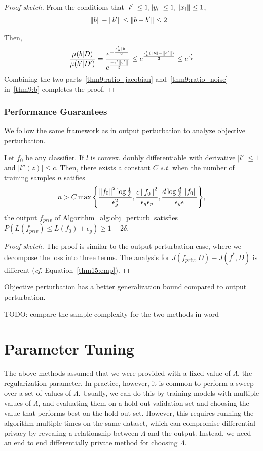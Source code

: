 \documentclass{article} %
\begin{document}
\begin{proof}[Proof sketch]
From the conditions that $\left\lvert l'\right\rvert \le 1, \left\lvert y_i\right\rvert \le 1, \left\lVert x_i\right\rVert \le 1$,
\begin{align*}
& \left\lVert b\right\rVert - \left\lVert b'\right\rVert \le \left\lVert b - b'\right\rVert \le 2
\end{align*}

Then, \begin{align}
 \frac{\mu(b | D)}{\mu(b' | D')} = \frac{e^{-\frac{\epsilon_p' \left\lVert b\right\rVert}{2}}}{e^{\frac{-\epsilon' \left\lVert b'\right\rVert}{2}}}\le e^{\frac{\epsilon_p'(\left\lVert b\right\rVert - \left\lVert b'\right\rVert)}{2}} \le e^{\epsilon'_p} \label{thm9:ratio_noise}
\end{align}
 Combining the two parts~\eqref{thm9:ratio_jacobian} and~\eqref{thm9:ratio_noise} in~\eqref{thm9:b} completes the proof.
\end{proof}

\subsubsection{Performance Guarantees}
We follow the same framework as in output perturbation to analyze objective perturbation.
\begin{theorem}
Let $f_0$ be any classifier. If $l$ is convex, doubly differentiable with derivative $|l'| \le 1$ and $|l''(z)| \le c$. Then, there exists a constant $C$ \emph{s.t.} when the number of training samples $n$ satifies
$$n > C\max{\left\{ \frac{\left\lVert f_0\right\rVert^2 \log{\frac{1}{\delta}}}{\epsilon_g^2}, \frac{c\left\lVert f_0\right\rVert^2}{\epsilon_g \epsilon_p}, \frac{d\log{\frac{d}{\delta}} \left\lVert f_0\right\rVert}{\epsilon_g\epsilon}\right\}},$$
the output $f_{priv}$ of Algorithm~\ref{alg:obj_perturb} satisfies $P(L(f_{priv}) \le L(f_0) + \epsilon_g) \ge 1 - 2\delta$.
\end{theorem}
\begin{proof}[Proof sketch]
The proof is similar to the output perturbation case, where we decompose the loss into three terms. The analysis for $J(f_{priv}, D) - J(f^*, D)$ is different (\emph{cf.} Equation~\eqref{thm15:emp}).
\end{proof}

Objective perturbation has a better generalization bound compared to output perturbation.

TODO: compare the sample complexity for the two methods in word
\section{Parameter Tuning}
The above methods assumed that we were provided with a fixed value of $\Lambda$,
the regularization parameter. In practice, however, it is common to perform a
sweep over a set of values of $\Lambda$. Usually, we can do this by training
models with multiple values of $\Lambda$, and evaluating them on a hold-out
validation set and choosing the value that performs best on the hold-out set.
However, this requires running the algorithm multiple times on the same dataset,
which can compromise differential privacy by revealing a relationship between
$\Lambda$ and the output. Instead, we need an end to end differentially private
method for choosing $\Lambda$.
\end{document}
